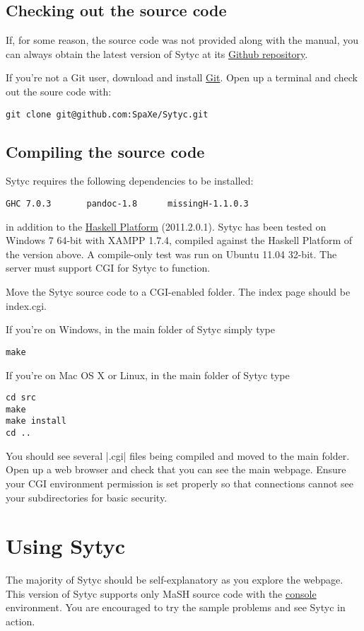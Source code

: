 \documentclass[a4paper]{article}
\begin{document}
\subsection{Checking out the source code}

If, for some reason, the source code was not provided along with the manual, you can always obtain the latest version of Sytyc at its  \href{https://github.com/SpaXe/Sytyc}{Github repository}.

If you're not a Git user, download and install \href{http://git-scm.com/}{Git}.  Open up a terminal and check out the soure code with:
\begin{verbatim}
git clone git@github.com:SpaXe/Sytyc.git
\end{verbatim}

\subsection{Compiling the source code}

Sytyc requires the following dependencies to be installed:
\begin{verbatim}
GHC 7.0.3       pandoc-1.8      missingH-1.1.0.3
\end{verbatim}
in addition to the \href{http://hackage.haskell.org/platform/}{Haskell Platform} (2011.2.0.1).  Sytyc has been tested on Windows 7 64-bit with XAMPP 1.7.4, compiled against the Haskell Platform of the version above.  A compile-only test was run on Ubuntu 11.04 32-bit.  The server must support CGI for Sytyc to function.

Move the Sytyc source code to a CGI-enabled folder.  The index page should be index.cgi.

If you're on Windows, in the main folder of Sytyc simply type
\begin{verbatim}
make
\end{verbatim}

If you're on Mac OS X or Linux, in the main folder of Sytyc type
\begin{verbatim}
cd src
make
make install
cd ..
\end{verbatim}

You should see several |.cgi| files being compiled and moved to the main folder.  Open up a web browser and check that you can see the main webpage.  Ensure your CGI environment permission is set properly so that connections cannot see your subdirectories for basic security.

\section{Using Sytyc}
The majority of Sytyc should be self-explanatory as you explore the webpage.  This version of Sytyc supports only MaSH source code with the \href{http://www.ict.griffith.edu.au/arock/MaSH/console.html}{console} environment.  You are encouraged to try the sample problems and see Sytyc in action.
\end{document}
